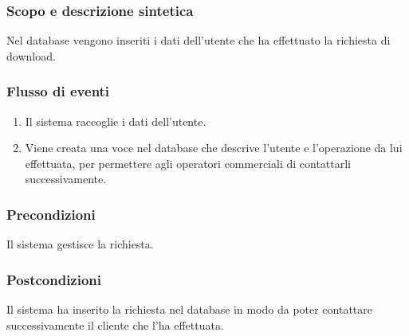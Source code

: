 \subsubsection*{Scopo e descrizione sintetica}
Nel database vengono inseriti i dati dell'utente che ha effettuato la richiesta di download. 
\subsubsection*{Flusso di eventi}
\begin{enumerate}
\item Il sistema raccoglie i dati dell'utente.
\item Viene creata una voce nel database che descrive l'utente e l'operazione da lui effettuata, per permettere agli 
operatori commerciali di contattarli successivamente.
\end{enumerate}
\subsubsection*{Precondizioni} Il sistema gestisce la richiesta.
\subsubsection*{Postcondizioni} Il sistema ha inserito la richiesta nel database in modo da poter contattare successivamente
il cliente che l'ha effettuata.
